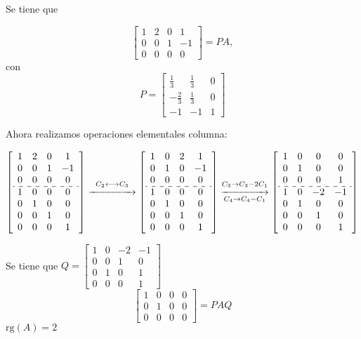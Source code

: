 Se tiene que 

$$\begin{bmatrix}
	1 & 2 & 0 & 1 \\ 
	0 & 0 & 1 & -1 \\ 
	0 & 0 & 0 & 0
\end{bmatrix}=PA,$$ con $$P=\begin{bmatrix}
	\textstyle\frac{1}{3} & \textstyle\frac{1}{3} & 0 \\ 
	-\textstyle\frac{2}{3} & \textstyle\frac{1}{3} & 0 \\ 
	-1 & -1 & 1	
\end{bmatrix} $$

Ahora realizamos operaciones elementales columna:

$\left[\begin{array}{cccc}
	1 & 2 & 0 & 1 \\ 
	0 & 0 & 1 & -1 \\ 
	0 & 0 & 0 & 0 \\ \hdashline
	1 & 0 & 0 & 0 \\ 
	0 & 1 & 0 & 0 \\ 
	0 & 0 & 1 & 0 \\ 
	0 & 0 & 0 & 1
\end{array}\right]\overset{C_2\longleftrightarrow
	C_3}{\xrightarrow{\hspace{1.5cm}}}\left[\begin{array}{cccc}
	1 & 0 & 2 & 1 \\ 
	0 & 1 & 0 & -1 \\ 
	0 & 0 & 0 & 0 \\ \hdashline
	1 & 0 & 0 & 0 \\ 
	0 & 1 & 0 & 0 \\ 
	0 & 0 & 1 & 0 \\ 
	0 & 0 & 0 & 1
\end{array}\right]\overset{C_3\rightarrow
	C_3-2C_1}{\underset{C_4\rightarrow
		C_4-C_1}{\xrightarrow{\hspace{1.5cm}}}}\left[\begin{array}{cccc}
	1 & 0 & 0 & 0 \\ 
	0 & 1 & 0 & 0 \\ 
	0 & 0 & 0 & 1 \\ 
	\hdashline
	1 & 0 & -2 & -1 \\ 
	0 & 1 & 0 & 0 \\ 
	0 & 0 & 1 & 0 \\ 
	0 & 0 & 0 & 1
\end{array}\right] $

Se tiene que $Q=\begin{bmatrix}
	1 & 0 & -2 & -1 \\ 
	0 & 0 & 1 & 0 \\ 
	0 & 1 & 0 & 1 \\ 
	0 & 0 & 0 & 1
\end{bmatrix} $ \[ \left[\begin{array}{cc|cc}
1 & 0 & 0 & 0 \\
0 & 1 & 0 & 0 \\ \hline
0 & 0 & 0 & 0
\end{array}\right]=PAQ \]$\mathrm{rg}(A)=2$
